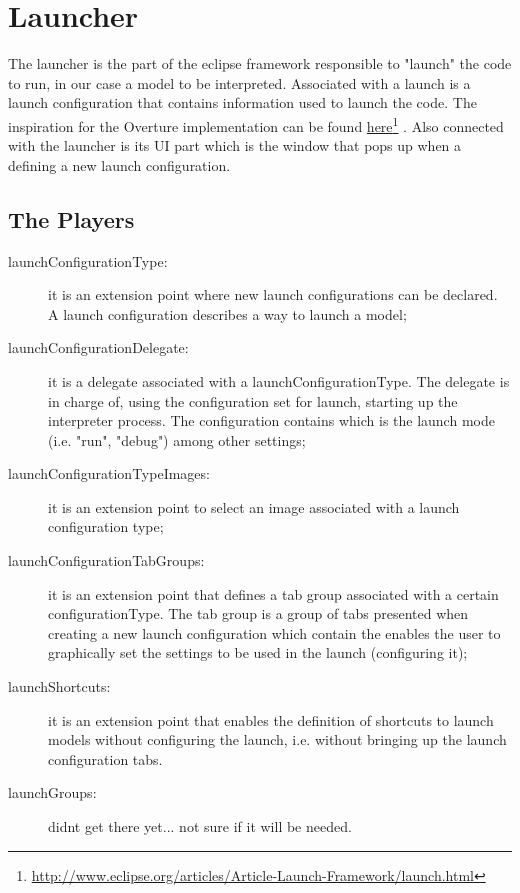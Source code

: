 \section{Launcher}
The launcher is the part of the eclipse framework responsible to "launch" the code to run, in our case a model to be interpreted. Associated with a launch is a launch configuration that contains information used to launch the code. The inspiration for the Overture implementation can be found \href{http://www.eclipse.org/articles/Article-Launch-Framework/launch.html}{here}\footnote{\url{http://www.eclipse.org/articles/Article-Launch-Framework/launch.html}} \cite{Szurszewski03}. 
Also connected with the launcher is its UI part which is the window that pops up when a defining a new launch configuration.

\subsection{The Players}

\begin{description}
\item[launchConfigurationType:] it is an extension point where new launch configurations can be declared. A launch configuration describes a way to launch a model; 

\item[launchConfigurationDelegate:] it is a delegate associated with a launchConfigurationType. The delegate is in charge of, using the configuration set for launch, starting up the interpreter process. The configuration contains which is the launch mode (i.e. "run", "debug") among other settings;

\item[launchConfigurationTypeImages:] it is an extension point to select an image associated with a launch configuration type;

\item[launchConfigurationTabGroups:] it is an extension point that defines a tab group associated with a certain configurationType. The tab group is a group of tabs presented when creating a new launch configuration which contain the enables the user to graphically set the settings to be used in the launch (configuring it);

\item[launchShortcuts:] it is an extension point that enables the definition of shortcuts to launch models without configuring the launch, i.e. without bringing up the launch configuration tabs.

\item[launchGroups:] didnt get there yet... not sure if it will be needed.

\end{description}
